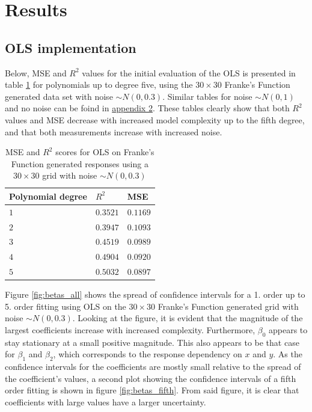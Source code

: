 \documentclass[%
oneside,                 %
final,                   %
10pt]{article}
\begin{document}
\section{Results}
\subsection{OLS implementation}
Below, MSE and $R^2$ values for the initial evaluation of the OLS is presented in table \ref{table:OLS_mse_r2} for polynomials up to degree five, using the  $30 \times 30$ Franke's Function generated data set with noise $\sim N(0,0.3)$. Similar tables for noise $\sim N(0,1)$ and no noise can be foind in \hyperref[APP_2]{appendix 2}. These tables clearly show that both $R^2$ values and MSE decrease with increased model complexity up to the fifth degree, and that both measurements increase with increased noise.  
\begin{table}[h!]
\begin{center}
\begin{tabular}{lll}
\hline
 Polynomial degree   & $R^2$      & MSE        \\
\hline
 $ 1 $               & $ 0.3521 $ & $ 0.1169 $ \\
 $ 2 $               & $ 0.3947 $ & $ 0.1093 $ \\
 $ 3 $               & $ 0.4519 $ & $ 0.0989 $ \\
 $ 4 $               & $ 0.4904 $ & $ 0.0920 $ \\
 $ 5 $               & $ 0.5032 $ & $ 0.0897 $ \\
\hline
\end{tabular}
\end{center}
\caption{MSE and $R^2$ scores for OLS on  Franke's Function generated responses using a $30\times 30$ grid with noise $\sim N(0,0.3)$ }
\label{table:OLS_mse_r2}
\end{table}

Figure \ref{fig:betas_all} shows the spread of confidence intervals for a 1. order up to 5. order fitting using OLS on the $30 \times 30$ Franke's Function generated grid with noise $\sim N(0,0.3)$. Looking at the figure, it is evident that the magnitude of the largest coefficients increase with increased complexity. Furthermore, $\beta_0$ appears to stay stationary at a small positive magnitude. This also appears to be that case for  $\beta_1$ and $\beta_2$, which corresponds to the response dependency on $x$ and $y$. As the confidence intervals for the coefficients are mostly small relative to the spread of the coefficient's values, a second plot showing the confidence intervals of a fifth order fitting is shown in figure \ref{fig:betas_fifth}. From said figure, it is clear that coefficients with large values have a larger uncertainty. 
\end{document}
